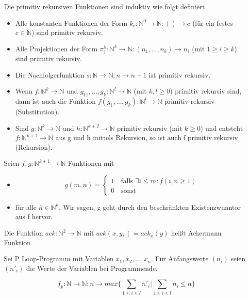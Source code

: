 \documentclass[avery5371]{flashcards}
\begin{document}
\begin{flashcard}[Definition]{  Die primitiv rekursiven Funktionen sind induktiv wie folgt definiert}
\begin{itemize}
\item Alle konstanten Funktionen der Form $k_c:\mathbb{N}^0\rightarrow\mathbb{N}:()\rightarrow c$ (für ein festes $c\in\mathbb{N}$) sind primitiv rekursiv.
\item Alle Projektionen der Form $\pi_i^k:\mathbb{N}^k\rightarrow\mathbb{N}: (n_1,..., n_k)\rightarrow n_i$ (mit $1\geq i\geq k$) sind primitiv rekursiv.
\item Die Nachfolgerfunktion $s:\mathbb{N}\rightarrow\mathbb{N}: n\rightarrow n + 1$ ist primitiv rekursiv.
\item Wenn $f:\mathbb{N}^k\rightarrow\mathbb{N}$ und $g_11,...,g_k:\mathbb{N}^l\rightarrow\mathbb{N}$ (mit $k,l\geq 0$) primitiv rekursiv sind, dann ist auch die Funktion $f(g_1,..., g_k):\mathbb{N}^l\rightarrow\mathbb{N}$ primitiv rekursiv (Substitution).
\item Sind $g:\mathbb{N}^k\rightarrow\mathbb{N}$ und $h:\mathbb{N}^{k+2}\rightarrow\mathbb{N}$ primitiv rekursiv (mit $k\geq 0$) und entsteht $f:\mathbb{N}^{k+1}\rightarrow\mathbb{N}$ aus g und h mittels Rekursion, so ist auch f primitiv rekursiv (Rekursion).
\end{itemize}
\end{flashcard}

\begin{flashcard}[Definition]{} Seien $f,g: \mathbb{N}^{k+1}\rightarrow\mathbb{N}$ Funktionen mit 
\begin{itemize}
\item $$g(m,\bar{n})= \begin{cases} 1 \quad\text{falls } \exists i\leq m: f(i,\bar{n}\geq 1) \\ 0 \quad\text{sonst} \end{cases}$$ 
\item für alle $\bar{n}\in\mathbb{N}^k$. Wir sagen, g geht durch den beschränkten Existenzwuantor aus f hervor.
\end{itemize}
\end{flashcard}

\begin{flashcard}[Definition]{} Die Funktion $ack:\mathbb{N}^2\rightarrow\mathbb{N}$ mit $ack(x,y,)=ack_x(y)$ heißt Ackermann Funktion
\end{flashcard}

\begin{flashcard}[Definition]{} Sei P Loop-Programm mit Variablen $x_1,x_2,...,x_n$. Für Anfangswerte $(n_i)$ seien $(n'_i)$ die Werte der Variablen bei Programmende.

$$f_p:\mathbb{N}\rightarrow\mathbb{N}: n\rightarrow max\{\sum_{1\leq i\leq l} n'_i | \sum_{1\leq i \leq l} n_i\leq n \}$$
\end{flashcard}
\end{document}
